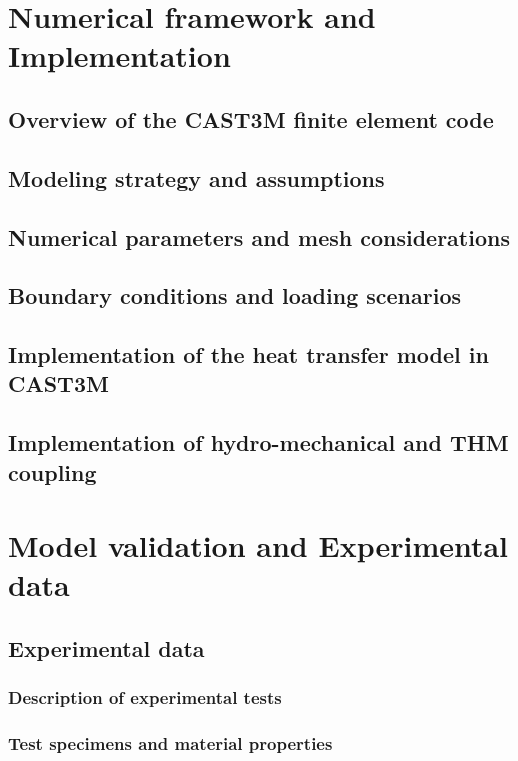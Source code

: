 \documentclass[twoside]{report}
\begin{document}


\cleardoublepage
\chapter{Numerical framework and Implementation}

\section{Overview of the CAST3M finite element code}
\section{Modeling strategy and assumptions}
\section{Numerical parameters and mesh considerations}
\section{Boundary conditions and loading scenarios}
\section{Implementation of the heat transfer model in CAST3M}
\section{Implementation of hydro-mechanical and THM coupling}




\cleardoublepage
\chapter{Model validation and Experimental data}

\section{Experimental data}
\subsection{Description of experimental tests}
\subsection{Test specimens and material properties}
\end{document}
